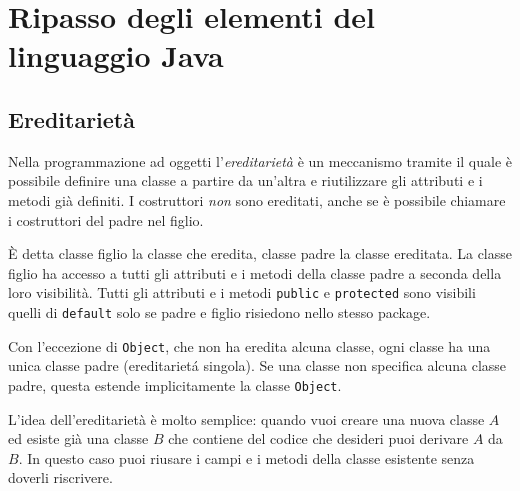 \documentclass{article}
\author{\textbf{\hmwkAuthorName}}
\date{} %
\begin{document}
\maketitle



\newpage
\tableofcontents
\newpage

\theoremstyle{definition} 

\newtheorem{mydef}{Definition}
\newtheorem{lemma}{Lemma}

\newtheorem{theorem}{Theorem}[section]

\section{Ripasso degli elementi del linguaggio Java}
\subsection{Ereditarietà}

Nella programmazione ad oggetti l'\emph{ereditarietà} è un meccanismo tramite il quale
è possibile definire una classe a partire da un'altra e riutilizzare gli attributi e i metodi
già definiti. I costruttori \emph{non} sono ereditati, anche se \`e possibile chiamare i costruttori del padre nel figlio.

È detta classe figlio la classe che eredita, classe padre la classe ereditata.
La classe figlio ha accesso a tutti gli attributi e i metodi della classe padre a seconda della loro visibilit\`a. Tutti gli attributi e i metodi \texttt{public} e \texttt{protected} sono visibili quelli di \texttt{default} solo se padre e figlio risiedono nello stesso package.

Con l'eccezione di  \texttt{Object}, che non ha eredita alcuna classe, ogni classe ha una unica classe padre (ereditariet\'a singola). Se una classe non specifica alcuna classe padre, questa estende implicitamente la classe \texttt{Object}.

L'idea dell'ereditariet\`a \`e molto semplice: quando vuoi creare una nuova classe $A$ ed esiste gi\`a una classe $B$ che contiene del codice che desideri puoi derivare $A$ da $B$. In questo caso puoi riusare i campi e i metodi della classe esistente senza doverli riscrivere.
\end{document}
